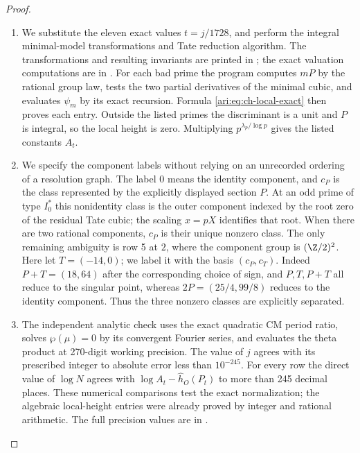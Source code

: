 \begin{proof}
\begin{enumerate}[label=\arabic*.,leftmargin=*]
\item We substitute the eleven exact values $t=j/1728$, and perform
the integral minimal-model transformations and Tate reduction
algorithm. The transformations and resulting invariants are
printed in ; the exact valuation
computations are in .
For each bad prime the program computes $mP$ by the rational
group law, tests the two partial derivatives of the minimal
cubic, and evaluates $\psi_m$ by its exact recursion. Formula
\eqref{ari:eq:ch-local-exact} then proves each entry. Outside the
listed primes the discriminant is a unit and $P$ is integral,
so the local height is zero. Multiplying $p^{\lambda_p/\log p}$
gives the listed constants $A_t$.

\item We specify the component labels without relying on an
unrecorded ordering of a resolution graph. The label $0$
means the identity component, and $c_P$ is the class represented
by the explicitly displayed section $P$. At an odd prime of
type $I_0^*$ this nonidentity class is the outer component
indexed by the root zero of the residual Tate cubic; the
scaling $x=pX$ identifies that root. When there are two
rational components, $c_P$ is their unique nonzero class.
The only remaining ambiguity is row 5 at $2$, where the
component group is $(\Z/2)^2$. Here let $T=(-14,0)$;
we label it with the basis $(c_P,c_T)$. Indeed
$P+T=(18,64)$ after the corresponding choice of sign,
and $P,T,P+T$ all reduce to the singular point, whereas
$2P=(25/4,99/8)$ reduces to the identity component.
Thus the three nonzero classes are explicitly separated.

\item The independent analytic check uses the exact quadratic CM
period ratio, solves $\wp(\mu)=0$ by its convergent Fourier
series, and evaluates the theta product at 270-digit working
precision. The value of $j$ agrees with its prescribed integer
to absolute error less than $10^{-245}$. For every row the
direct value of $\log N$ agrees with
$\log A_t-\widehat h_O(P_t)$ to more than 245 decimal places.
These numerical comparisons test the exact normalization;
the algebraic local-height entries were already proved by
integer and rational arithmetic. The full precision values
are in .
\end{enumerate}
\end{proof}

